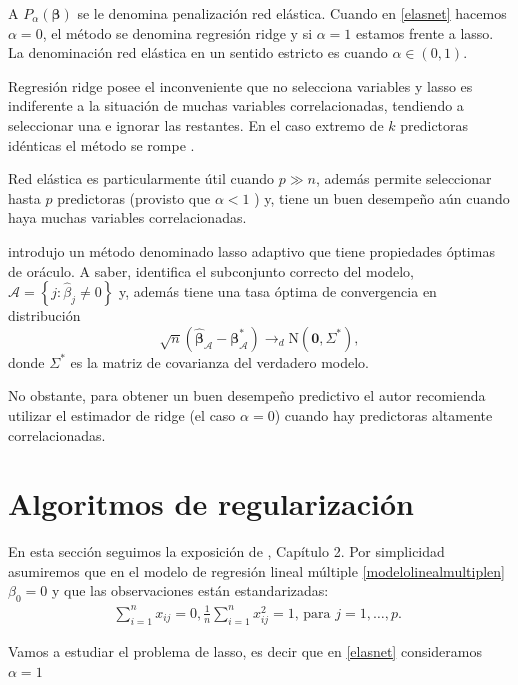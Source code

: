 \documentclass{report}
\begin{document}
 A $P_{\alpha}(\boldsymbol{\beta})$ se le denomina penalización red elástica. Cuando en \eqref{elasnet} hacemos  $\alpha=0$, el método se denomina regresión ridge y si $\alpha=1$ estamos frente a lasso.  La denominación red elástica en un sentido estricto es cuando $\alpha \in (0,1)$.


 Regresión ridge posee el inconveniente que no selecciona variables y lasso es indiferente a la situación de muchas variables correlacionadas, tendiendo a seleccionar una e ignorar las restantes. En el caso extremo de $k$ predictoras idénticas el método se rompe \citep{friedman2010}. 


 Red elástica es particularmente útil cuando $p \gg n$, además permite seleccionar hasta  $p$ predictoras (provisto que $\alpha < 1$ ) y, tiene  un buen desempeño aún cuando haya muchas variables correlacionadas. 


 \cite{zou2006} introdujo un método denominado lasso adaptivo  que tiene propiedades óptimas de oráculo. A saber, identifica el subconjunto correcto del modelo, $\mathcal{A}=\left\{j: \hat{\beta}_j \neq 0\right\}$ y, además tiene una tasa óptima de convergencia en distribución $$\sqrt{n}\left(\hat{\boldsymbol{\beta}}_{\mathcal{A}}-\boldsymbol{\beta}_{\mathcal{A}}^*\right) \rightarrow_d\mathrm{N}\left(\mathbf{0},  \Sigma^*\right),$$ donde $ \Sigma^*$ es la matriz de covarianza del verdadero modelo.

 No obstante, para obtener un buen desempeño predictivo el autor recomienda utilizar el estimador de ridge (el caso $\alpha = 0$) cuando  hay predictoras altamente correlacionadas. 


 
 \section{Algoritmos de regularización}
 
 
 En esta sección seguimos la exposición de \cite{htw}, Capítulo 2.  
 Por simplicidad asumiremos que  en el modelo de regresión lineal múltiple \eqref{modelolinealmultiplen} $\beta_0=0$ y que  las observaciones están estandarizadas:
 \begin{eqnarray}\label{estand}
 \sum_{i=1}^n x_{i j}=0, \frac{1}{n} \sum_{i=1}^n x_{i j}^2=1 \text {, para } j=1, \ldots, p \text {. }
 \end{eqnarray}


 Vamos a estudiar el problema de lasso, es decir que en \eqref{elasnet} consideramos $\alpha=1$
\end{document}
